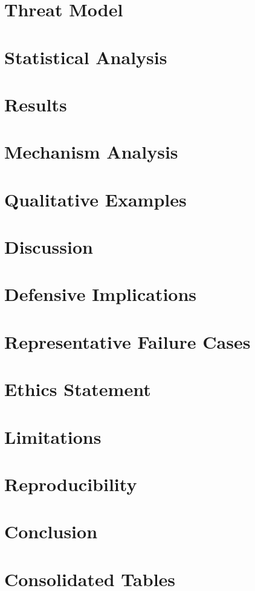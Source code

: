 \documentclass[11pt]{article}
\begin{document}
\section{Threat Model}


\section{Statistical Analysis}


\section{Results}


\section{Mechanism Analysis}


\section{Qualitative Examples}


\section{Discussion}


\section{Defensive Implications}


\section{Representative Failure Cases}


\section{Ethics Statement}


\section{Limitations}


\section{Reproducibility}


\section{Conclusion}


\appendix
\section{Consolidated Tables}




\end{document}

